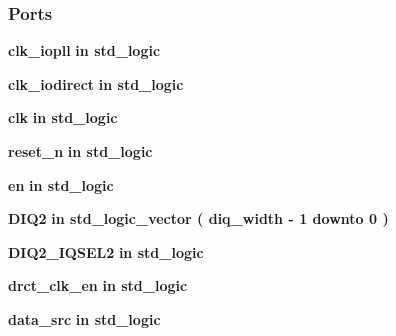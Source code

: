 \subsubsection*{Ports}
 \begin{DoxyCompactItemize}
\item 
{\bf clk\+\_\+iopll}  {\bfseries {\bfseries \textcolor{keywordflow}{in}\textcolor{vhdlchar}{ }}} {\bfseries \textcolor{comment}{std\+\_\+logic}\textcolor{vhdlchar}{ }} 
\item 
{\bf clk\+\_\+iodirect}  {\bfseries {\bfseries \textcolor{keywordflow}{in}\textcolor{vhdlchar}{ }}} {\bfseries \textcolor{comment}{std\+\_\+logic}\textcolor{vhdlchar}{ }} 
\item 
{\bf clk}  {\bfseries {\bfseries \textcolor{keywordflow}{in}\textcolor{vhdlchar}{ }}} {\bfseries \textcolor{comment}{std\+\_\+logic}\textcolor{vhdlchar}{ }} 
\item 
{\bf reset\+\_\+n}  {\bfseries {\bfseries \textcolor{keywordflow}{in}\textcolor{vhdlchar}{ }}} {\bfseries \textcolor{comment}{std\+\_\+logic}\textcolor{vhdlchar}{ }} 
\item 
{\bf en}  {\bfseries {\bfseries \textcolor{keywordflow}{in}\textcolor{vhdlchar}{ }}} {\bfseries \textcolor{comment}{std\+\_\+logic}\textcolor{vhdlchar}{ }} 
\item 
{\bf D\+I\+Q2}  {\bfseries {\bfseries \textcolor{keywordflow}{in}\textcolor{vhdlchar}{ }}} {\bfseries \textcolor{comment}{std\+\_\+logic\+\_\+vector}\textcolor{vhdlchar}{ }\textcolor{vhdlchar}{(}\textcolor{vhdlchar}{ }\textcolor{vhdlchar}{ }\textcolor{vhdlchar}{ }\textcolor{vhdlchar}{ }{\bfseries {\bf diq\+\_\+width}} \textcolor{vhdlchar}{-\/}\textcolor{vhdlchar}{ } \textcolor{vhdldigit}{1} \textcolor{vhdlchar}{ }\textcolor{keywordflow}{downto}\textcolor{vhdlchar}{ }\textcolor{vhdlchar}{ } \textcolor{vhdldigit}{0} \textcolor{vhdlchar}{ }\textcolor{vhdlchar}{)}\textcolor{vhdlchar}{ }} 
\item 
{\bf D\+I\+Q2\+\_\+\+I\+Q\+S\+E\+L2}  {\bfseries {\bfseries \textcolor{keywordflow}{in}\textcolor{vhdlchar}{ }}} {\bfseries \textcolor{comment}{std\+\_\+logic}\textcolor{vhdlchar}{ }} 
\item 
{\bf drct\+\_\+clk\+\_\+en}  {\bfseries {\bfseries \textcolor{keywordflow}{in}\textcolor{vhdlchar}{ }}} {\bfseries \textcolor{comment}{std\+\_\+logic}\textcolor{vhdlchar}{ }} 
\item 
{\bf data\+\_\+src}  {\bfseries {\bfseries \textcolor{keywordflow}{in}\textcolor{vhdlchar}{ }}} {\bfseries \textcolor{comment}{std\+\_\+logic}\textcolor{vhdlchar}{ }} 

\end{DoxyCompactItemize}
